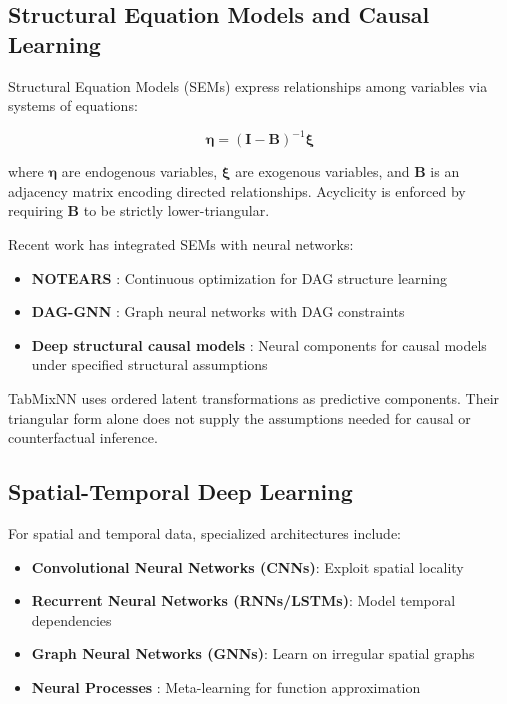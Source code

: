 \documentclass[12pt,a4paper]{article}
\begin{document}
\subsection{Structural Equation Models and Causal Learning}

Structural Equation Models (SEMs) \citep{bollen1989structural} express relationships among variables via systems of equations:

\begin{equation}
    \boldsymbol{\eta} = (\mathbf{I} - \mathbf{B})^{-1}\boldsymbol{\xi}
\end{equation}

where $\boldsymbol{\eta}$ are endogenous variables, $\boldsymbol{\xi}$ are exogenous variables, and $\mathbf{B}$ is an adjacency matrix encoding directed relationships. Acyclicity is enforced by requiring $\mathbf{B}$ to be strictly lower-triangular.

Recent work has integrated SEMs with neural networks:
\begin{itemize}
    \item \textbf{NOTEARS} \citep{zheng2018dags}: Continuous optimization for DAG structure learning
    \item \textbf{DAG-GNN} \citep{yu2019dag}: Graph neural networks with DAG constraints
    \item \textbf{Deep structural causal models} \citep{pawlowski2020deep}: Neural components for causal models under specified structural assumptions
\end{itemize}

TabMixNN uses ordered latent transformations as predictive components. Their triangular form alone does not supply the assumptions needed for causal or counterfactual inference.

\subsection{Spatial-Temporal Deep Learning}

For spatial and temporal data, specialized architectures include:
\begin{itemize}
    \item \textbf{Convolutional Neural Networks (CNNs)}: Exploit spatial locality
    \item \textbf{Recurrent Neural Networks (RNNs/LSTMs)}: Model temporal dependencies
    \item \textbf{Graph Neural Networks (GNNs)}: Learn on irregular spatial graphs
    \item \textbf{Neural Processes} \citep{garnelo2018neural}: Meta-learning for function approximation
\end{itemize}
\end{document}
